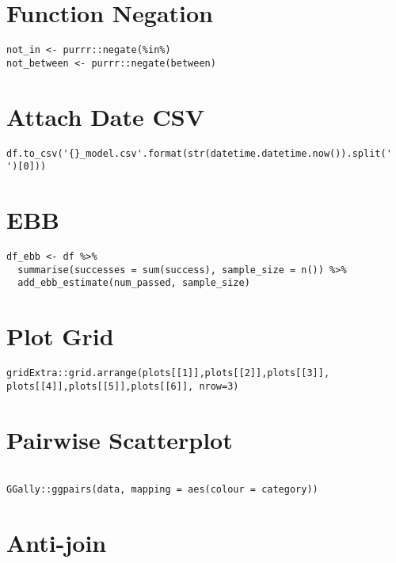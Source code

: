 \documentclass[]{book}
\begin{document}
\section{Function Negation}\label{function-negation}

\begin{verbatim}
not_in <- purrr::negate(%in%)
not_between <- purrr::negate(between)
\end{verbatim}

\section{Attach Date CSV}\label{attach-date-csv}

\begin{verbatim}
df.to_csv('{}_model.csv'.format(str(datetime.datetime.now()).split(' ')[0]))
\end{verbatim}

\section{EBB}\label{ebb}

\begin{verbatim}
df_ebb <- df %>%
  summarise(successes = sum(success), sample_size = n()) %>%
  add_ebb_estimate(num_passed, sample_size)
\end{verbatim}

\section{Plot Grid}\label{plot-grid}

\begin{verbatim}
gridExtra::grid.arrange(plots[[1]],plots[[2]],plots[[3]], plots[[4]],plots[[5]],plots[[6]], nrow=3)
\end{verbatim}

\section{Pairwise Scatterplot}\label{pairwise-scatterplot}

\begin{verbatim}

GGally::ggpairs(data, mapping = aes(colour = category))
\end{verbatim}

\section{Anti-join}\label{anti-join}
\end{document}
